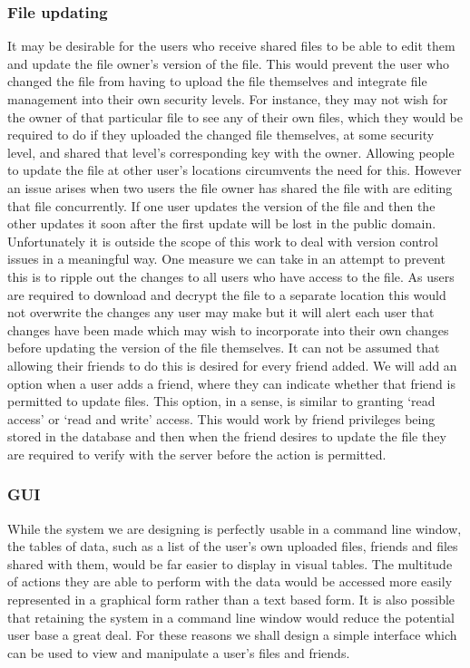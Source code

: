 \documentclass[12pt, titlepage]{article}
\begin{document}
\subsubsection{File updating}
It may be desirable for the users who receive shared files to be able to edit them and update the file owner's version of the file. This would prevent the user who changed the file from having to upload the file themselves and integrate file management into their own security levels. For instance, they may not wish for the owner of that particular file to see any of their own files, which they would be required to do if they uploaded the changed file themselves, at some security level, and shared that level's corresponding key with the owner. Allowing people to update the file at other user's locations circumvents the need for this.
\newline \indent However an issue arises when two users the file owner has shared the file with are editing that file concurrently. If one user updates the version of the file and then the other updates it soon after the first update will be lost in the public domain. Unfortunately it is outside the scope of this work to deal with version control issues in a meaningful way. One measure we can take in an attempt to prevent this is to ripple out the changes to all users who have access to the file. As users are required to download and decrypt the file to a separate location this would not overwrite the changes any user may make but it will alert each user that changes have been made which may wish to incorporate into their own changes before updating the version of the file themselves.
\newline \indent It can not be assumed that allowing their friends to do this is desired for every friend added. We will add an option when a user adds a friend, where they can indicate whether that friend is permitted to update files. This option, in a sense, is similar to granting `read access' or `read and write' access. This would work by friend privileges being stored in the database and then when the friend desires to update the file they are required to verify with the server before the action is permitted.

\subsubsection{GUI}
While the system we are designing is perfectly usable in a command line window, the tables of data, such as a list of the user's own uploaded files, friends and files shared with them, would be far easier to display in visual tables. The multitude of actions they are able to perform with the data would be accessed more easily represented in a graphical form rather than a text based form. It is also possible that retaining the system in a command line window would reduce the potential user base a great deal. For these reasons we shall design a simple interface which can be used to view and manipulate a user's files and friends.
\end{document}
